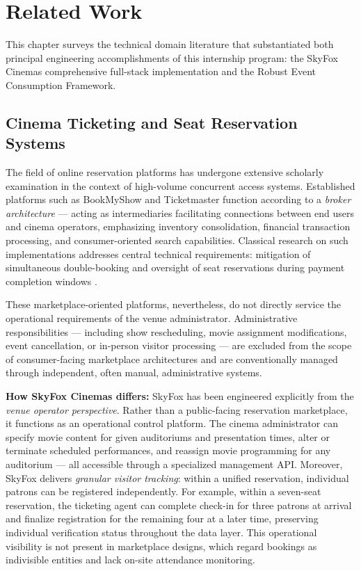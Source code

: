 \chapter{Related Work}

This chapter surveys the technical domain literature that substantiated both 
principal engineering accomplishments of this internship program: the SkyFox 
Cinemas comprehensive full-stack implementation and the Robust Event Consumption 
Framework.

\section{Cinema Ticketing and Seat Reservation Systems}

The field of online reservation platforms has undergone extensive scholarly 
examination in the context of high-volume concurrent access systems. Established 
platforms such as BookMyShow and Ticketmaster function according to a 
\textit{broker architecture} --- acting as intermediaries facilitating connections 
between end users and cinema operators, emphasizing inventory consolidation, 
financial transaction processing, and consumer-oriented search capabilities. 
Classical research on such implementations addresses central technical requirements: 
mitigation of simultaneous double-booking and oversight of seat reservations 
during payment completion windows \cite{Bernstein2009}.

These marketplace-oriented platforms, nevertheless, do not directly service the 
operational requirements of the venue administrator. Administrative responsibilities --- 
including show rescheduling, movie assignment modifications, event cancellation, 
or in-person visitor processing --- are excluded from the scope of consumer-facing 
marketplace architectures and are conventionally managed through independent, often 
manual, administrative systems.

\textbf{How SkyFox Cinemas differs:} SkyFox has been engineered explicitly from the 
\textit{venue operator perspective}. Rather than a public-facing reservation marketplace, 
it functions as an operational control platform. The cinema administrator can specify 
movie content for given auditoriums and presentation times, alter or terminate scheduled 
performances, and reassign movie programming for any auditorium --- all accessible through 
a specialized management API. Moreover, SkyFox delivers \textit{granular visitor tracking}: 
within a unified reservation, individual patrons can be registered independently. For 
example, within a seven-seat reservation, the ticketing agent can complete check-in for 
three patrons at arrival and finalize registration for the remaining four at a later time, 
preserving individual verification status throughout the data layer. This operational 
visibility is not present in marketplace designs, which regard bookings as indivisible 
entities and lack on-site attendance monitoring.

